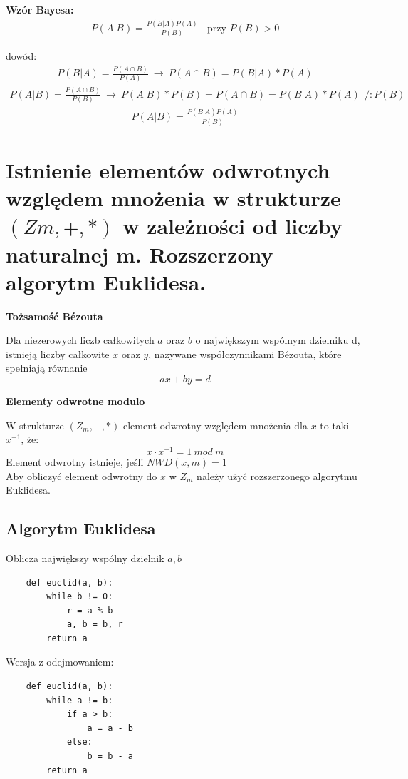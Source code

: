 \documentclass[12pt]{article}
\begin{document}
    \textbf{Wzór Bayesa:}
    \begin{align*}
        P(A|B) = \frac{P(B|A)P(A)}{P(B)} ~ ~ ~ ~ \text{przy $P(B) > 0$}
    \end{align*}

    dowód:
    \begin{align*}
        P(B|A) = \frac{P(A \cap B)}{P(A)} ~ \rightarrow ~ P(A \cap B) = P(B|A) * P(A)
    \end{align*}
    \begin{align*}
        P(A|B) = \frac{P(A \cap B)}{P(B)} ~ \rightarrow ~ P(A|B)* P(B) = P(A \cap B) = P(B|A) * P(A) ~~ /:P(B)
    \end{align*}
    \begin{align*}
        P(A|B) = \frac{P(B|A)P(A)}{P(B)}
    \end{align*}


    \newpage

    \section{Istnienie elementów odwrotnych względem mnożenia w strukturze $(Zm, +, *)$ w zależności od liczby naturalnej m. Rozszerzony algorytm Euklidesa.}

    \begin{theorem}
        \textbf{Tożsamość Bézouta}

        Dla niezerowych liczb całkowitych $a$ oraz $b$ o największym wspólnym dzielniku d, istnieją liczby całkowite $x$ oraz $y$, nazywane współczynnikami Bézouta, które spełniają równanie
        \[ax + by = d\]
    \end{theorem}

    \begin{definition}
        \textbf{Elementy odwrotne modulo}

        W strukturze $(Z_m, +, *)$ element odwrotny względem mnożenia dla $x$ to taki $x^{-1}$, że:
        \[ x \cdot x^{-1} = 1 \  mod \  m \]
        Element odwrotny istnieje, jeśli $NWD(x, m) = 1$\\


        Aby obliczyć element odwrotny do $x$ w $Z_{m}$ należy użyć rozszerzonego algorytmu Euklidesa.
    \end{definition}
    \subsection{Algorytm Euklidesa}
    Oblicza największy wspólny dzielnik $a, b$
    \begin{verbatim}
    def euclid(a, b):
        while b != 0:
            r = a % b
            a, b = b, r
        return a
    \end{verbatim}
    Wersja z odejmowaniem:
    \begin{verbatim}
    def euclid(a, b):
        while a != b:
            if a > b:
                a = a - b
            else:
                b = b - a
        return a
    \end{verbatim}
\end{document}
